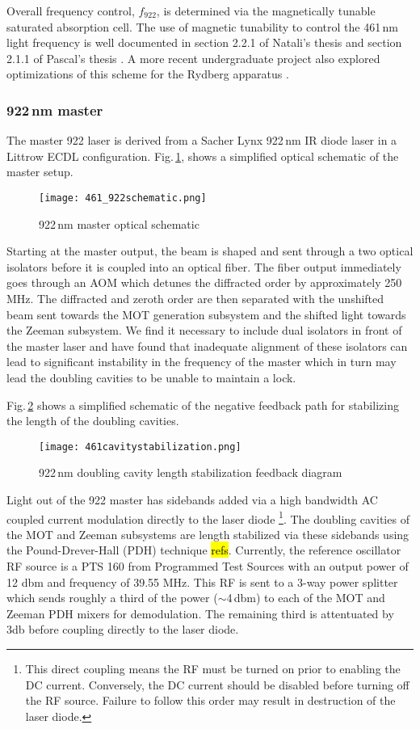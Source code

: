 Overall frequency control, $f_{922}$, is determined via the magnetically tunable saturated absorption cell.
The use of magnetic tunability to control the 461\,nm light frequency is well documented in section 2.2.1 of Natali's thesis \cite{MartinezdeEscolar2010} and section 2.1.1 of Pascal's thesis \cite{Mickelson2010b}.
A more recent undergraduate project also explored optimizations of this scheme for the Rydberg apparatus \cite{MichaelViray2014}.

\subsubsection{922\,nm master}
The master 922 laser is derived from a Sacher Lynx 922\,nm IR diode laser in a Littrow ECDL configuration.
Fig.\,\ref{fig:922optical}, shows a simplified optical schematic of the master setup.
	\begin{figure}
		\centerline{
		\texttt{[image: 461\_922schematic.png]}}
		\caption{922\,nm master optical schematic}
		\label{fig:922optical}
	\end{figure} 
	
Starting at the master output, the beam is shaped and sent through a two optical isolators before it is coupled into an optical fiber.
The fiber output immediately goes through an AOM which detunes the diffracted order by approximately 250 MHz.
The diffracted and zeroth order are then separated with the unshifted beam sent towards the MOT generation subsystem and the shifted light towards the Zeeman subsystem.
We find it necessary to include dual isolators in front of the master laser and have found that inadequate alignment of these isolators can lead to significant instability in the frequency of the master which in turn may lead the doubling cavities to be unable to maintain a lock.

Fig.\,\ref{fig:461cavityLock} shows a simplified schematic of the negative feedback path for stabilizing the length of the doubling cavities.
	\begin{figure}
		\centerline{
		\texttt{[image: 461cavitystabilization.png]}}
		\caption{922\,nm doubling cavity length stabilization feedback diagram}
		\label{fig:461cavityLock}
	\end{figure}
Light out of the 922 master has sidebands added via a high bandwidth AC coupled current modulation directly to the laser diode 
\footnote{This direct coupling means the RF must be turned on prior to enabling the DC current. 
Conversely, the DC current should be disabled before turning off the RF source. 
Failure to follow this order may result in destruction of the laser diode.}.
The doubling cavities of the MOT and Zeeman subsystems are length stabilized via these sidebands using the Pound-Drever-Hall (PDH) technique \hl{refs}.
Currently, the reference oscillator RF source is a PTS 160 from Programmed Test Sources with an output power of 12 dbm and frequency of 39.55 MHz.
This RF is sent to a 3-way power splitter which sends roughly a third of the power ($\sim$4\,dbm) to each of the MOT and Zeeman PDH mixers for demodulation. 
The remaining third is attentuated by 3db before coupling directly to the laser diode.

